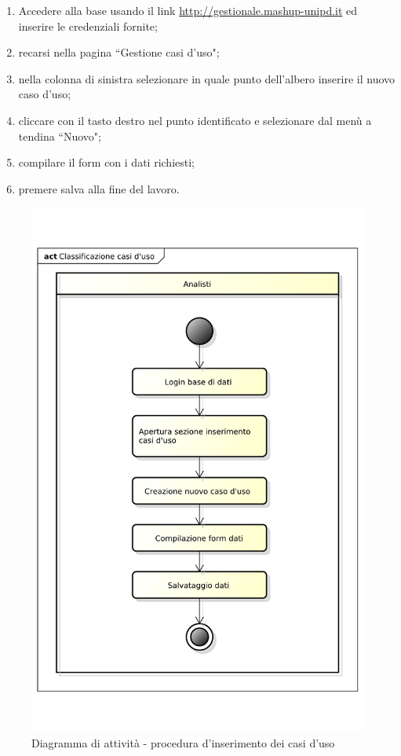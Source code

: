 				\begin{enumerate}
			 		\item Accedere alla base usando il link \url{http://gestionale.mashup-unipd.it} ed inserire le credenziali fornite;
			 		\item recarsi nella pagina ``Gestione casi d'uso";
					\item nella colonna di sinistra selezionare in quale punto dell'albero inserire il nuovo caso d'uso;
					\item cliccare con il tasto destro nel punto identificato e selezionare dal menù a tendina ``Nuovo";
					\item compilare il form con i dati richiesti;
					\item premere salva alla fine del lavoro.
			 	\end{enumerate}

			 	\begin{figure}
					\centering
					\includegraphics[scale=0.4]{images/classificazione_uc.pdf}
					\caption{Diagramma di attività - procedura d'inserimento dei casi d'uso}
					\label{fig:procedura_inserimento_uc}
				\end{figure}



